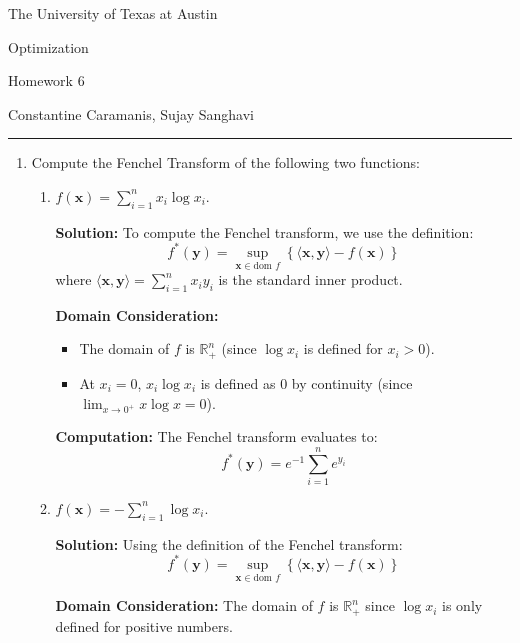 \documentclass{article}
\begin{document}
\begin{center}
{\large The University of Texas at Austin}

{\large Optimization}

\vspace{1cm}

{\large Homework 6}

\vspace{1cm}

Constantine Caramanis, Sujay Sanghavi

\vspace{0.5cm}
\hrule
\end{center}

\begin{enumerate}
    \item Compute the Fenchel Transform of the following two functions:
    \begin{enumerate}
        \item 
        $f(\mathbf{x}) = \sum_{i=1}^n x_i \log x_i.$
        
        \textbf{Solution:} To compute the Fenchel transform, we use the definition:
        \[
        f^*(\mathbf{y}) = \sup_{\mathbf{x} \in \text{dom } f} \left\{ \langle \mathbf{x}, \mathbf{y} \rangle - f(\mathbf{x}) \right\}
        \]
        where $\langle \mathbf{x}, \mathbf{y} \rangle = \sum_{i=1}^n x_i y_i$ is the standard inner product.

        \textbf{Domain Consideration:}
        \begin{itemize}
            \item The domain of $f$ is $\mathbb{R}_+^n$ (since $\log x_i$ is defined for $x_i > 0$).
            \item At $x_i = 0$, $x_i \log x_i$ is defined as $0$ by continuity (since $\lim_{x \to 0^+} x \log x = 0$).
        \end{itemize}

        \textbf{Computation:}
        The Fenchel transform evaluates to:
        \[
        f^*(\mathbf{y}) = e^{-1} \sum_{i=1}^n e^{y_i}
        \]
        
        \item
        $f(\mathbf{x}) = -\sum_{i=1}^n \log x_i.$

        \textbf{Solution:} Using the definition of the Fenchel transform:
        \[
        f^*(\mathbf{y}) = \sup_{\mathbf{x} \in \text{dom } f} \left\{ \langle \mathbf{x}, \mathbf{y} \rangle - f(\mathbf{x}) \right\}
        \]

        \textbf{Domain Consideration:}
        The domain of $f$ is $\mathbb{R}_+^n$ since $\log x_i$ is only defined for positive numbers.


\end{enumerate}
\end{enumerate}
\end{document}
